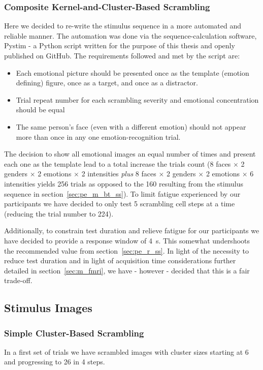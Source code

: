 	    \subsubsection{Composite Kernel-and-Cluster-Based Scrambling}\label{sec:pe_m_bt_cs}
		Here we decided to re-write the stimulus sequence in a more automated and reliable manner.
		The automation was done via the sequence-calculation software, Pystim \citep{pystim} - a Python script written for the purpose of this thesis and openly published on GitHub.
		The requirements followed and met by the script are:
		\begin{itemize}
		    \item Each emotional picture should be presented once as the template (emotion defining) figure, once as a target, and once as a distractor.
		    \item Trial repeat number for each scrambling severity and emotional concentration should be equal
		    \item The same person's face (even with a different emotion) should not appear more than once in any one emotion-recognition trial.
		\end{itemize}
		The decision to show all emotional images an equal number of times and present each one as the template lead to a total increase the trials count
		(8 faces $\times$ 2 genders $\times$ 2 emotions $\times$ 2 intensities \textit{plus} 8 faces $\times$ 2 genders $\times$ 2 emotions $\times$ 6 intensities yields 256 trials as opposed to the 160 resulting from the stimulus sequence in section~\ref{sec:pe_m_bt_ss}).
		To limit fatigue experienced by our participants we have decided to only test 5 scrambling cell steps at a time (reducing the trial number to 224).
		
		Additionally, to constrain test duration and relieve fatigue for our participants we have decided to provide a response window of \SI{4}{\second}.
		This somewhat undershoots the recommended value from section~\ref{sec:pe_r_ss}.
		In light of the necessity to reduce test duration and in light of acquisition time considerations further detailed in section~\ref{sec:m_fmri}, we have - however - decided that this is a fair trade-off.
	\subsection{Stimulus Images}\label{sec:pe_m_si}
	    \subsubsection{Simple Cluster-Based Scrambling}
		In a first set of trials we have scrambled images with cluster sizes starting at \SI{6}{\pixel} and progressing to \SI{26}{\pixel} in \SI{4}{\pixel} steps.
